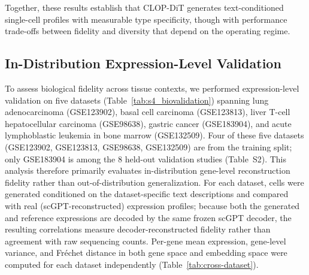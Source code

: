 Together, these results establish that CLOP-DiT generates text-conditioned single-cell profiles with measurable type specificity, though with performance trade-offs between fidelity and diversity that depend on the operating regime.

\subsection{In-Distribution Expression-Level Validation}\label{sec:cross-dataset}

To assess biological fidelity across tissue contexts, we performed expression-level validation on five datasets (Table~\ref{tab:s4_biovalidation}) spanning lung adenocarcinoma (GSE123902), basal cell carcinoma (GSE123813), liver T-cell hepatocellular carcinoma (GSE98638), gastric cancer (GSE183904), and acute lymphoblastic leukemia in bone marrow (GSE132509). Four of these five datasets (GSE123902, GSE123813, GSE98638, GSE132509) are from the training split; only GSE183904 is among the 8 held-out validation studies (Table~S2). This analysis therefore primarily evaluates in-distribution gene-level reconstruction fidelity rather than out-of-distribution generalization. For each dataset, cells were generated conditioned on the dataset-specific text descriptions and compared with real (scGPT-reconstructed) expression profiles; because both the generated and reference expressions are decoded by the same frozen scGPT decoder, the resulting correlations measure decoder-reconstructed fidelity rather than agreement with raw sequencing counts. Per-gene mean expression, gene-level variance, and Fr\'{e}chet distance in both gene space and embedding space were computed for each dataset independently (Table~\ref{tab:cross-dataset}).

